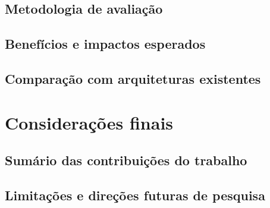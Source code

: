 \documentclass[12pt]{article}
\begin{document}
\subsection{Metodologia de avaliação} \label{sec:analise}
\subsection{Benefícios e impactos esperados} \label{sec:analise}
\subsection{Comparação com arquiteturas existentes} \label{sec:analise}

\section{Considerações finais} \label{sec:consideracoes}
\subsection{Sumário das contribuições do trabalho} \label{sec:consideracoes}
\subsection{Limitações e direções futuras de pesquisa} \label{sec:consideracoes}




\end{document}
